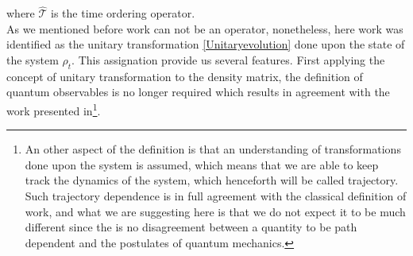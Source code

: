 where $\hat{\mathcal{T}}$ is the time ordering operator.\\
As we mentioned before work can not be an operator, nonetheless, here work was identified as the unitary transformation \eqref{Unitaryevolution} done upon the state of the system $\rho_t$\cite{2540650509c442d0b14e917fdf7a4ca7}. This assignation provide us several features. First applying the concept of unitary transformation to the density matrix, the definition of quantum observables is no longer required which results in agreement with the work presented in\cite{PhysRevE.75.050102}\footnote{An other aspect of the definition is that an understanding of transformations done upon the system is assumed, which means that we are able to keep track the dynamics of the system, which henceforth will be called trajectory. Such trajectory dependence is in full agreement with the classical definition of work, and what we are suggesting here is that we do not expect it to be much different since the is no disagreement between a quantity to be path dependent and the postulates of quantum mechanics.}.
